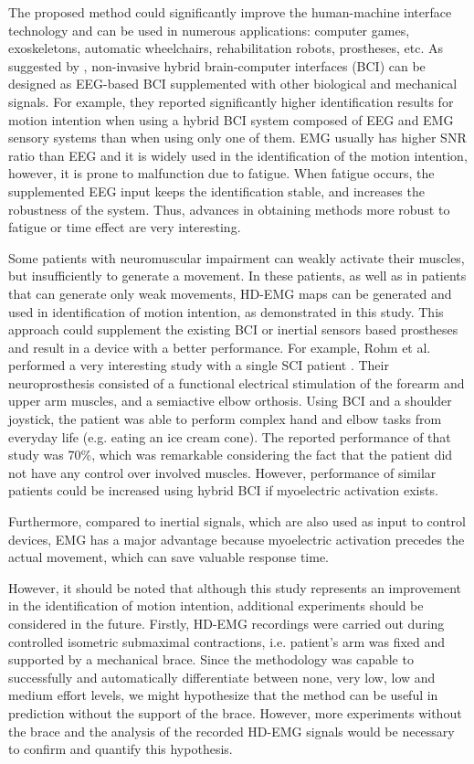 The proposed method could significantly improve the human-machine interface technology and can be used in numerous applications: computer games, exoskeletons, automatic wheelchairs, rehabilitation robots, prostheses, etc. As suggested by \citet{Muller-Putz2015}, non-invasive hybrid brain-computer interfaces (BCI) can be designed as EEG-based BCI supplemented with other biological and mechanical signals. For example, they reported significantly higher identification results for motion intention when using a hybrid BCI system composed of EEG and EMG sensory systems than when using only one of them. EMG usually has higher SNR ratio than EEG and it is widely used in the identification of the motion intention, however, it is prone to malfunction due to fatigue. When fatigue occurs, the supplemented EEG input keeps the identification stable, and increases the robustness of the system. Thus, advances in obtaining methods more robust to fatigue or time effect are very interesting.

Some patients with neuromuscular impairment can weakly activate their muscles, but insufficiently to generate a movement. In these patients, as well as in patients that can generate only weak movements, HD-EMG maps can be generated and used in identification of motion intention, as demonstrated in this study. This approach could supplement the existing BCI or inertial sensors based prostheses and result in a device with a better performance. For example, Rohm et al. performed a very interesting study with a single SCI patient \citep{Rohm2013}. Their neuroprosthesis consisted of a functional electrical stimulation of the forearm and upper arm muscles, and a semiactive elbow orthosis. Using BCI and a shoulder joystick, the patient was able to perform complex hand and elbow tasks from everyday life (e.g. eating an ice cream cone). The reported performance of that study was 70\%, which was remarkable considering the fact that the patient did not have any control over involved muscles. However, performance of similar patients could be increased using hybrid BCI if myoelectric activation exists.

Furthermore, compared to inertial signals, which are also used as input to control devices, EMG has a major advantage because myoelectric activation precedes the actual movement, which can save valuable response time.

However, it should be noted that although this study represents an improvement in the identification of motion intention, additional experiments should be considered in the future. Firstly, HD-EMG recordings were carried out during controlled isometric submaximal contractions, i.e. patient’s arm was fixed and supported by a mechanical brace. Since the methodology was capable to successfully and automatically differentiate between none, very low, low and medium effort levels, we might hypothesize that the method can be useful in prediction without the support of the brace. However, more experiments without the brace and the analysis of the recorded HD-EMG signals would be necessary to confirm and quantify this hypothesis.



